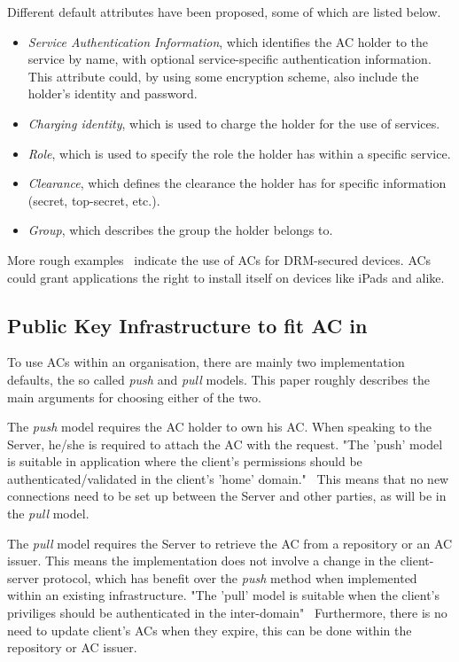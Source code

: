 \documentclass[10pt,conference,a4paper]{IEEEtran}
\begin{document}
Different default attributes have been proposed, some of which are listed below.~\cite{benantar2006access,rfc_ac}
\begin{itemize}
	\item \textit{Service Authentication Information}, which identifies the AC holder to the service by name, with optional service-specific authentication information. This attribute could, by using some encryption scheme, also include the holder's identity and password.
	\item \textit{Charging identity}, which is used to charge the holder for the use of services.
	\item \textit{Role}, which is used to specify the role the holder has within a specific service.
	\item \textit{Clearance}, which defines the clearance the holder has for specific information (secret, top-secret, etc.).
	\item \textit{Group}, which describes the group the holder belongs to.
\end{itemize}

More rough examples~\cite{tilborg2011encyclopedia} indicate the use of ACs for DRM-secured devices. ACs could grant applications the right to install itself on devices like iPads and alike.

\subsection{Public Key Infrastructure to fit AC in}
To use ACs within an organisation, there are mainly two implementation defaults, the so called \textit{push} and \textit{pull} models. This paper roughly describes the main arguments for choosing either of the two.

The \textit{push} model requires the AC holder to own his AC. When speaking to the Server, he/she is required to attach the AC with the request. "The 'push' model is suitable in application where the client's permissions should be authenticated/validated in the client's 'home' domain."~\cite{godavari2001secure} This means that no new connections need to be set up between the Server and other parties, as will be in the \textit{pull} model.

The \textit{pull} model requires the Server to retrieve the AC from a repository or an AC issuer. This means the implementation does not involve a change in the client-server protocol, which has benefit over the \textit{push} method when implemented within an existing infrastructure. "The 'pull' model is suitable when the client's priviliges should be authenticated in the inter-domain"~\cite{godavari2001secure} Furthermore, there is no need to update client's ACs when they expire, this can be done within the repository or AC issuer.
\end{document}
